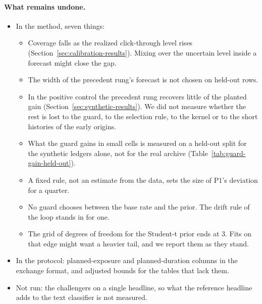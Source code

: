 \paragraph{What remains undone.}
\begin{itemize}
\item In the method, seven things:
\begin{itemize}
\item Coverage falls as the realized click-through level rises (Section~\ref{sec:calibration-results}). Mixing over the uncertain level inside a forecast might close the gap.
\item The width of the precedent rung's forecast is not chosen on held-out rows.
\item In the positive control the precedent rung recovers little of the planted gain (Section~\ref{sec:synthetic-results}). We did not measure whether the rest is lost to the guard, to the selection rule, to the kernel or to the short histories of the early origins.
\item What the guard gains in small cells is measured on a held-out split for the synthetic ledgers alone, not for the real archive (Table~\ref{tab:guard-gain-held-out}).
\item A fixed rule, not an estimate from the data, sets the size of P1's deviation for a quarter.
\item No guard chooses between the base rate and the prior. The drift rule of the loop stands in for one.
\item The grid of degrees of freedom for the Student-t prior ends at 3. Fits on that edge might want a heavier tail, and we report them as they stand.
\end{itemize}
\item In the protocol: planned-exposure and planned-duration columns in the exchange format, and adjusted bounds for the tables that lack them.
\item Not run: the challengers on a single headline, so what the reference headline adds to the text classifier is not measured.
\end{itemize}

